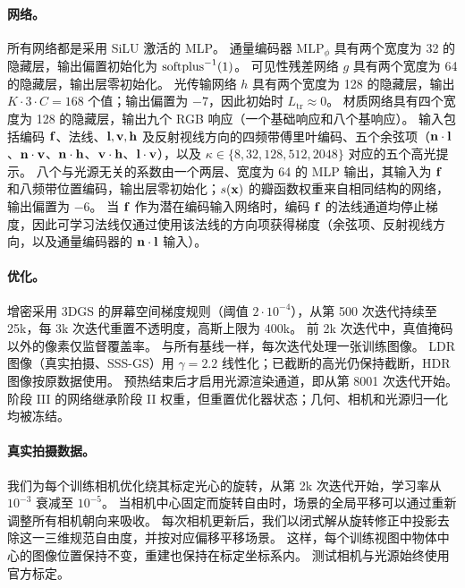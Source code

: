 \documentclass[10pt,twocolumn,letterpaper]{article}
\begin{document}
\paragraph{网络。}
所有网络都是采用 SiLU 激活的 MLP。
通量编码器 $\mathrm{MLP}_\phi$ 具有两个宽度为 32 的隐藏层，输出偏置初始化为 $\operatorname{softplus}^{-1}(1)$。
可见性残差网络 $g$ 具有两个宽度为 64 的隐藏层，输出层零初始化。
光传输网络 $h$ 具有两个宽度为 128 的隐藏层，输出 $K\cdot3\cdot C=168$ 个值；输出偏置为 $-7$，因此初始时 $L_{\mathrm{tr}}\approx0$。
材质网络具有四个宽度为 128 的隐藏层，输出九个 RGB 响应（一个基础响应和八个基响应）。
输入包括编码 $\mathbf{f}$、法线、$\mathbf{l},\mathbf{v},\mathbf{h}$ 及反射视线方向的四频带傅里叶编码、五个余弦项（$\mathbf{n}\cdot\mathbf{l}$、$\mathbf{n}\cdot\mathbf{v}$、$\mathbf{n}\cdot\mathbf{h}$、$\mathbf{v}\cdot\mathbf{h}$、$\mathbf{l}\cdot\mathbf{v}$），以及 $\kappa\in\{8,32,128,512,2048\}$ 对应的五个高光提示。
八个与光源无关的系数由一个两层、宽度为 64 的 MLP 输出，其输入为 $\mathbf{f}$ 和八频带位置编码，输出层零初始化；$s(\mathbf{x})$ 的瓣函数权重来自相同结构的网络，输出偏置为 $-6$。
当 $\mathbf{f}$ 作为潜在编码输入网络时，编码 $\mathbf{f}$ 的法线通道均停止梯度，因此可学习法线仅通过使用该法线的方向项获得梯度（余弦项、反射视线方向，以及通量编码器的 $\mathbf{n}\cdot\mathbf{l}$ 输入）。

\paragraph{优化。}
增密采用 3DGS 的屏幕空间梯度规则（阈值 $2\cdot10^{-4}$），从第 500 次迭代持续至 25k，每 3k 次迭代重置不透明度，高斯上限为 400k。
前 2k 次迭代中，真值掩码以外的像素仅监督覆盖率。
与所有基线一样，\ours 每次迭代处理一张训练图像。
LDR 图像（真实拍摄、SSS-GS）用 $\gamma=2.2$ 线性化；已截断的高光仍保持截断，HDR \gsthree 图像按原数据使用。
预热结束后才启用光源渲染通道，即从第 8001 次迭代开始。
阶段 III 的网络继承阶段 II 权重，但重置优化器状态；几何、相机和光源归一化均被冻结。

\paragraph{真实拍摄数据。}
我们为每个训练相机优化绕其标定光心的旋转，从第 2k 次迭代开始，学习率从 $10^{-3}$ 衰减至 $10^{-5}$。
当相机中心固定而旋转自由时，场景的全局平移可以通过重新调整所有相机朝向来吸收。
每次相机更新后，我们以闭式解从旋转修正中投影去除这一三维规范自由度，并按对应偏移平移场景。
这样，每个训练视图中物体中心的图像位置保持不变，重建也保持在标定坐标系内。
测试相机与光源始终使用官方标定。
\end{document}
